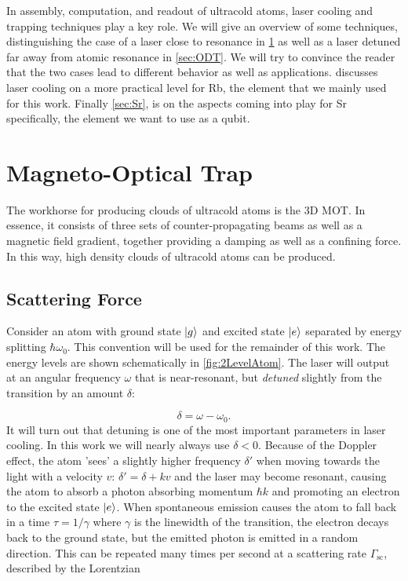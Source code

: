 In assembly, computation, and readout of ultracold atoms, laser cooling and trapping techniques play a key role. 
We will give an overview of some techniques, distinguishing the case of a laser close to resonance in \cref{sec:MOT} as well as a laser detuned far away from atomic resonance in \cref{sec:ODT}.
We will try to convince the reader that the two cases lead to different behavior as well as applications.
 discusses laser cooling on a more practical level for Rb, the element that we mainly used for this work. 
Finally \cref{sec:Sr}, is on the aspects coming into play for Sr specifically, the element we want to use as a qubit.


\section{Magneto-Optical Trap}\label{sec:MOT}

The workhorse for producing clouds of ultracold atoms is the 3D \ac{MOT}. 
In essence, it consists of three sets of counter-propagating beams as well as a magnetic field gradient, together providing a damping as well as a confining force. 
In this way, high density clouds of ultracold atoms can be produced. 

\subsection{Scattering Force}

Consider an atom with ground state $\lvert g\rangle$ and excited state $\lvert e\rangle$ separated by energy splitting $\hbar \omega_0$.
This convention will be used for the remainder of this work.
The energy levels are shown schematically in \cref{fig:2LevelAtom}.
The laser will output at an angular frequency $\omega$ that is near-resonant, but \emph{detuned} slightly from the transition by an amount $\delta$:

\begin{equation}\label{detuning}
	\delta = \omega - \omega_0.
\end{equation}
It will turn out that detuning is one of the most important parameters in laser cooling. 
In this work we will nearly always use $\delta <0$. 
Because of the Doppler effect, the atom 'sees' a slightly higher frequency $\delta'$ when moving towards the light with a velocity $v$: $\delta'=\delta+k v$ and the laser may become resonant, causing the atom to absorb a photon absorbing momentum $\hbar k$ and promoting an electron to the excited state $\lvert e\rangle$.
When spontaneous emission causes the atom to fall back in a time $\tau = 1/\gamma$ where $\gamma$ is the linewidth of the transition, the electron decays back to the ground state, but the emitted photon is emitted in a random direction. 
This can be repeated many times per second at a scattering rate $\Gamma_{\text{sc}}$, described by the Lorentzian \cite{Metcalf1999}

